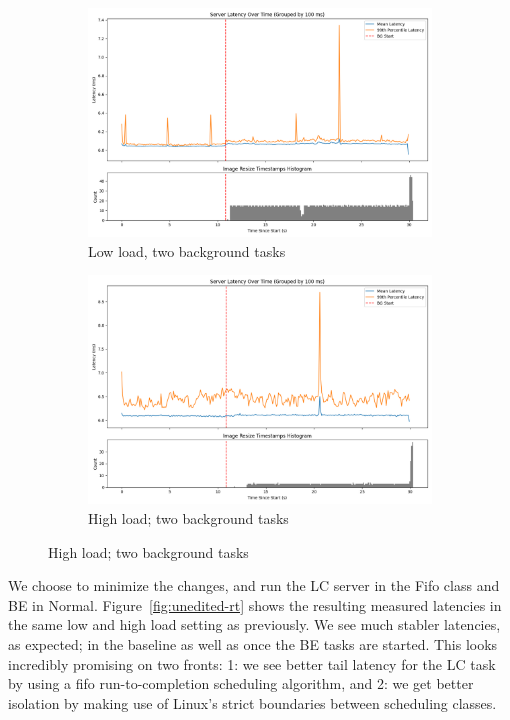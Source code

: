\begin{figure}[t]
    \centering
    \begin{subfigure}[t]{0.48\textwidth}
        \includegraphics[width=\textwidth]{graphs/unedited-rt-low-two.png}
        \caption{Low load, two background tasks}\label{fig:unedited-rt-low-two}
    \end{subfigure}
    \hspace{\fill}
    \begin{subfigure}[t]{0.48\textwidth}
        \includegraphics[width=\textwidth]{graphs/unedited-rt-high-two.png}
        \caption{High load; two background tasks}\label{fig:unedited-rt-high-two}
    \end{subfigure}
\end{figure}\label{fig:unedited-rt}

We choose to minimize the changes, and run the LC server in the Fifo class and
BE in Normal. Figure~\ref{fig:unedited-rt} shows the resulting measured
latencies in the same low and high load setting as previously. We see much
stabler latencies, as expected; in the baseline as well as once the BE tasks are
started. This looks incredibly promising on two fronts: 1: we see better tail
latency for the LC task by using a fifo run-to-completion scheduling algorithm,
and 2: we get better isolation by making use of Linux's strict boundaries
between scheduling classes.

